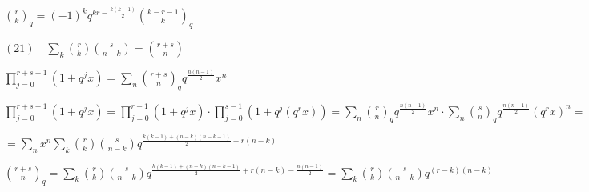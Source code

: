 \documentclass{article}
\begin{document}
$\binom{r}{k}_q = (-1)^kq^{kr - \frac{k(k-1)}{2}} \binom{k-r-1}{k}_q$

$(21)\quad \sum_{k}\binom{r}{k}\binom{s}{n-k} = \binom{r+s}{n}$

$\prod_{j=0}^{r+s-1} (1 + q^j x) = \sum_n \binom{r+s}{n}_q q^{\frac{n(n-1)}{2}} x^n$

$\prod_{j=0}^{r+s-1} (1 + q^j x) = \prod_{j=0}^{r-1} (1 + q^j x) \cdot \prod_{j=0}^{s-1} (1 + q^j (q^r x)) = \sum_n \binom{r}{n}_q q^{\frac{n(n-1)}{2}} x^n \cdot \sum_n \binom{s}{n}_q q^{\frac{n(n-1)}{2}} (q^rx)^n =$

$= \sum_n x^n \sum_k \binom{r}{k}\binom{s}{n-k}q^{\frac{k(k-1) + (n-k)(n-k-1)}{2} + r(n-k)}$

$\binom{r+s}{n}_q = \sum_k \binom{r}{k}\binom{s}{n-k}q^{\frac{k(k-1) + (n-k)(n-k-1)}{2} + r(n-k) - \frac{n(n-1)}{2}} = \sum_k \binom{r}{k}\binom{s}{n-k}q^{(r-k)(n-k)}$
\end{document}
